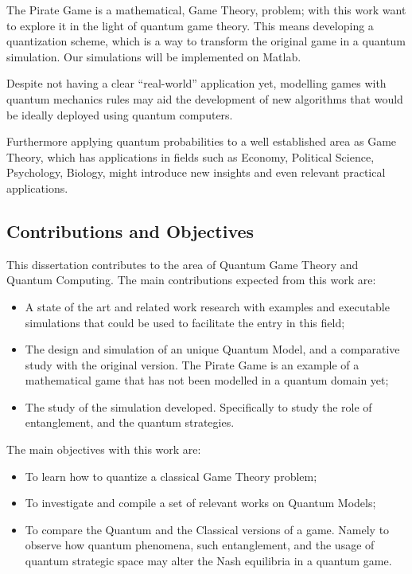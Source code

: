 \documentclass[10pt,twocolumn]{llncs}
\begin{document}
The Pirate Game is a mathematical, Game Theory, problem; with this work want to explore it in the light of quantum game theory. This means developing a quantization scheme, which is a way to transform the original game in a quantum simulation. Our simulations will be implemented on Matlab.

Despite not having a clear ``real-world'' application yet, modelling games with quantum mechanics rules may aid the development of new algorithms that would be ideally deployed using quantum computers. 

Furthermore applying quantum probabilities to a well established area as Game Theory, which has applications in fields such as Economy, Political Science, Psychology, Biology, might introduce new insights and even relevant practical applications\cite{Eisert2008}. 
\subsection{Contributions and Objectives}
This dissertation contributes to the area of Quantum Game Theory and Quantum Computing. The main contributions expected from this work are:

\begin{itemize}

\item A state of the art and related work research with examples and executable simulations that could be used to facilitate the entry in this field;

\item The design and simulation of an unique Quantum Model, and a comparative study with the original version. The Pirate Game is an example of a mathematical game that has not been modelled in a quantum domain yet;

\item The study of the simulation developed. Specifically to study the role of entanglement, and the quantum strategies.
\end{itemize}
The main objectives with this work are: 

\begin{itemize}
\item To learn how to quantize a classical Game Theory problem;

\item To investigate and compile a set of relevant works on Quantum Models;

\item To compare the Quantum and the Classical versions of a game. Namely to observe how quantum phenomena, such entanglement, and the usage of quantum strategic space may alter the Nash equilibria in a quantum game.

\end{itemize}
\end{document}
